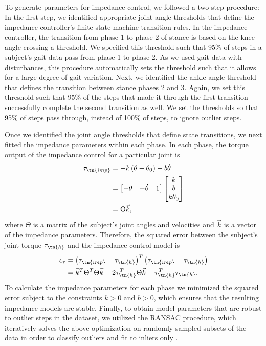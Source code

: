 To generate parameters for impedance control, we followed a two-step procedure:
In the first step, we identified appropriate joint angle thresholds that define
the impedance controller's finite state machine transition rules. In the
impedance controller, the transition from phase 1 to phase 2 of stance is based
on the knee angle crossing a threshold. We specified this threshold such that
95\% of steps in a subject's gait data pass from phase 1 to phase 2. As we used
gait data with disturbances, this procedure automatically sets the threshold
such that it allows for a large degree of gait variation. Next, we identified
the ankle angle threshold that defines the transition between stance phases 2
and 3.  Again, we set this threshold such that 95\% of the steps that made it
through the first transition successfully complete the second transition as
well. We set the thresholds so that 95\% of steps pass through, instead of 100\%
of steps, to ignore outlier steps.

Once we identified the joint angle thresholds that define state transitions, we
next fitted the impedance parameters within each phase. In each phase, the torque
output of the impedance control for a particular joint is 
\begin{align}
    \tau_\tn{imp} &= -k \left( \theta - \theta_0 \right) - b \dot{\theta} \\
        &= \begin{bmatrix} -\theta & -\dot{\theta} & 1 \end{bmatrix}
            \begin{bmatrix} k \\ b \\ k \theta_0 \end{bmatrix} \\
        &= \Theta \vec{k},
\end{align}
where $\Theta$ is a matrix of the subject's joint angles and velocities and
$\vec{k}$ is a vector of the impedance parameters. Therefore, the squared error
between the subject's joint torque $\tau_\tn{h}$ and the impedance control model
is
\begin{align}
    \epsilon_\tau & = {\left( \tau_\tn{imp} - \tau_\tn{h} \right)}^T 
        \left( \tau_\tn{imp} - \tau_\tn{h} \right) \\
        &= \vec{k}^T \Theta^T \Theta \vec{k} - 2\tau_\tn{h}^T \Theta \vec{k} 
        + \tau_\tn{h}^T \tau_\tn{h}.
\end{align}
To calculate the impedance parameters for each phase we minimized the squared
error subject to the constraints $k>0$ and ${b > 0}$, which ensures that the
resulting impedance models are stable. Finally, to obtain model parameters that
are robust to outlier steps in the dataset, we utilized the RANSAC procedure,
which iteratively solves the above optimization on randomly sampled subsets of
the data in order to classify outliers and fit to inliers only
\citep{fischler1981random}.

